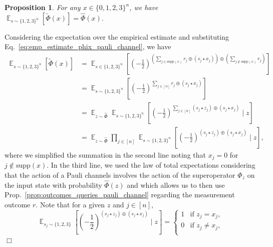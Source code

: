 \documentclass[11pt]{article}
\theoremstyle{plain}
\newtheorem{proposition}[theorem]{Proposition}
\theoremstyle{plain}
\theoremstyle{definition}
\theoremstyle{remark}
\renewenvironment{proof}[1][]{
    \begin{trivlist}
    \item[\hspace{\labelsep}{\em\noindent Proof#1:\/}]}
    {{\hfill$\Box$}
    \end{trivlist}
}
\theoremstyle{named}
\begin{document}
\begin{proposition} For any $x \in \{0,1,2,3\}^n$, we have $\mathop{\mathbb{E}}_{s \sim \{1,2,3\}^n}\left[ \widetilde{\Phi}(x) \right] = \widehat{\Phi}(x).$
\label{prop:consistency_emp_est_pauli_channels}
\end{proposition}
\begin{proof}
    Considering the expectation over the empirical estimate and substituting Eq.~\ref{eq:emp_estimate_phix_pauli_channel}, we have
    \begin{align}
        \mathop{\mathbb{E}}_{s \sim \{1,2,3\}^n}\left[ \widetilde{\Phi}(x) \right] &= \mathop{\mathbb{E}}_{s \in \{1,2,3\}^n}\left[ \left(- \frac{1}{2}\right)^{\left(\sum \limits_{j \in \text{supp}(x)} r_j \oplus ({s_j} \star x_j) \right) \oplus \left(\sum \limits_{j \notin \text{supp}(x)} r_j \right) } \right] \nonumber \\
        &= \mathop{\mathbb{E}}_{s \sim \{1,2,3\}^n}\left[ \left(- \frac{1}{2}\right)^{\sum \limits_{j \in [n]} r_j \oplus ({s_j} \star x_j)} \right] \nonumber \\
        &= \mathop{\mathbb{E}}_{z \sim \widehat{\Phi}} \mathop{\mathbb{E}}_{s \sim \{1,2,3\}^n} \left[ \left(- \frac{1}{2}\right)^{\sum \limits_{j \in [n]} ({s_j} \star z_j) \oplus ({s_j} \star x_j)} \mid z \right]
        \nonumber \\
        &= \mathop{\mathbb{E}}_{z \sim \widehat{\Phi}} \prod_{j\in [n]}\mathop{\mathbb{E}}_{s \sim \{1,2,3\}^n} \left[ \left(- \frac{1}{2}\right)^{ ({s_j} \star z_j) \oplus ({s_j} \star x_j)} \mid z \right],
        \label{eq:simplified_emp_est}
    \end{align}
where we simplified the summation in the second line noting that $x_j = 0$ for $j \notin \text{supp}(x)$. In the third line, we used the law of total expectations considering that the action of a Pauli channels involves the action of the superoperator $\Phi_z$ on the input state with probability $\widehat{\Phi}(z)$ and which allows us to then use Prop.~\ref{prop:outcomes_queries_pauli_channel} regarding the measurement outcome $r$. Note that for a given $z$ and $j \in [n]$,
\begin{equation}
    \mathop{\mathbb{E}}_{s_j \sim \{1,2,3\}} \left[ \left(- \frac{1}{2}\right)^{({s_j} \star z_j) \oplus (s_j\star x_j)} \mid z \right] = 
    \begin{cases}
        1 & \text{if } z_j = x_j, \\
        0 & \text{if } z_j \neq x_j, \\
    \end{cases}

\end{equation}
\end{proof}
\end{document}
